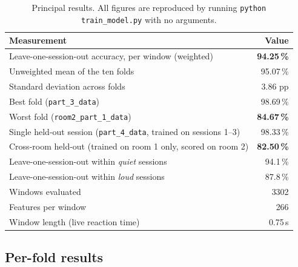 \documentclass[11pt,a4paper]{article}
\newcommand{\code}[1]{\texttt{\small #1}}
\newcommand{\roomA}{\code{room2\_part\_1\_data}}
\begin{document}
\begin{table}[H]
\centering
\caption{Principal results. All figures are reproduced by running
\code{python train\_model.py} with no arguments.}
\label{tab:results}
\begin{tabularx}{\linewidth}{@{}Xr@{}}
\toprule
\textbf{Measurement} & \textbf{Value} \\
\midrule
Leave-one-session-out accuracy, per window (weighted) & \textbf{94.25\,\%} \\
Unweighted mean of the ten folds                      & 95.07\,\% \\
Standard deviation across folds                       & 3.86 pp \\
Best fold (\code{part\_3\_data})                       & 98.69\,\% \\
Worst fold (\roomA)                                    & \textbf{84.67\,\%} \\
\midrule
Single held-out session (\code{part\_4\_data}, trained on sessions 1--3) & 98.33\,\% \\
Cross-room held-out (trained on room 1 only, scored on room 2)           & \textbf{82.50\,\%} \\
\midrule
Leave-one-session-out within \emph{quiet} sessions     & 94.1\,\% \\
Leave-one-session-out within \emph{loud} sessions      & 87.8\,\% \\
\midrule
Windows evaluated                                      & 3302 \\
Features per window                                    & 266 \\
Window length (live reaction time)                     & 0.75\,s \\
\bottomrule
\end{tabularx}
\end{table}

\subsection{Per-fold results}
\end{document}
